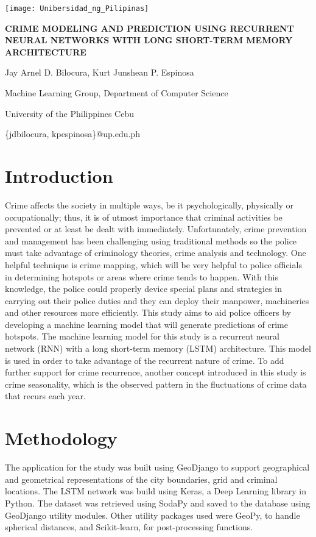 \documentclass[a0]{sciposter}
\begin{document}
    \begin{center}
    \texttt{[image: Unibersidad\_ng\_Pilipinas]}
    \par\Large\MakeUppercase{\textbf{Crime Modeling and Prediction using Recurrent Neural Networks with Long Short-term Memory Architecture}}
    \par Jay Arnel D. Bilocura, Kurt Junshean P. Espinosa
    \par Machine Learning Group, Department of Computer Science
    \par University of the Philippines Cebu
    \par \{jdbilocura, kpespinosa\}@up.edu.ph
    \end{center}
    \begin{multicols}{2}
    \section {Introduction}
    Crime affects the society in multiple ways, be it psychologically, physically or occupationally; thus, it is of utmost importance that criminal activities be prevented or at least be dealt with immediately. Unfortunately, crime prevention and management has been challenging using traditional methods so the police must take advantage of criminology theories, crime analysis and technology. One helpful technique is crime mapping, which will be very helpful to police officials in determining hotspots or areas where crime tends to happen. With this knowledge, the police could properly device special plans and strategies in carrying out their police duties and they can deploy their manpower, machineries and other resources more efficiently. This study aims to aid police officers by developing a machine learning model that will generate predictions of crime hotspots. The machine learning model for this study is a recurrent neural network (RNN) with a long short-term memory (LSTM) architecture. This model is used in order to take advantage of the recurrent nature of crime. To add further support for crime recurrence, another concept introduced in this study is crime seasonality, which is the observed pattern in the fluctuations of crime data that recurs each year.
    \section {Methodology}
    The application for the study was built using GeoDjango to support geographical and geometrical representations of the city boundaries, grid and criminal locations. The LSTM network was build using Keras, a Deep Learning library in Python. The dataset was retrieved using SodaPy and saved to the database using GeoDjango utility modules. Other utility packages used were GeoPy, to handle spherical distances, and Scikit-learn, for post-processing functions.


\end{multicols}
\end{document}
